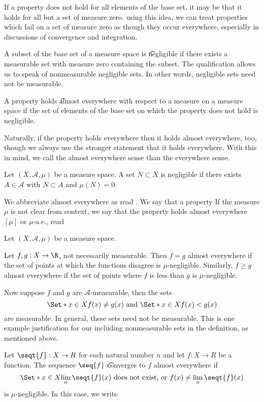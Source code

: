 

If a property does not hold for all elements of the base set, it may be that it holds for all but a set of measure zero.
using this idea, we can treat properties which fail on a set of measure zero as though they occur everywhere, especially in discussions of convergence and integration.


A subset of the base set of a measure space is \t{negligible} if there exists a measurable set with measure zero containing the subset.
The qualification  allows us to speak of nonmeasurable negligible sets.
In other words, negligible sets need not be measurable.


A property holds \t{almost everywhere} with respect to a measure on a measure space if the set of elements of the base set on which the property does not hold is negligible.

Naturally, if the property holds everywhere then it holds almost everywhere, too, though we always use the stronger statement that it holds everywhere.
With this in mind, we call the almost everywhere sense  than the everywhere sense.


Let $(X, \mathcal{A}, \mu)$ be a measure space.
A set $N \subset X$ is negligible if there exists $A \in \mathcal{A}$ with $N \subset A$ and $\mu(N) = 0$.

We abbreviate almost everywhere as  read .
We say that a property 
If the measure $\mu$ is not clear from context, we say that the property holds almost everywhere $[\mu]$ or $\mu$-a.e., read 


Let $(X, \mathcal{A}, \mu)$ be a measure space.


Let $f, g: X \to \R$, not necessarily measurable.
Then $f = g$ almost everywhere if the set of points at which the functions disagree is
$\mu$-negligible.
Similarly, $f \geq g$ almost everywhere if the set of points where $f$ is less than $g$ is $\mu$-negligible.

Now suppose $f$ and $g$ are $\mathcal{A}$-measurable, then the sets
\[
\Set*{x \in X}{f(x) \neq g(x)}
\text{ and }
\Set*{x \in X}{f(x) < g(x)}
\]
are measurable.
In general, these sets need not be measurable.
This is one example justification for our including nonmeasurable sets in the definition, as mentioned above.

Let $\seqt{f}: X \to R$ for each natural number $n$ and let $f: X \to R$ be a function.
The sequence $\seq{f}$ \t{converges to $f$ almost everywhere} if
\[
  \Set*{x \in X}{\lim_{n} \seqt{f}(x) \text{ does not exist, or } f(x) \neq \lim_{n} \seqt{f}(x)}
\]
is $\mu$-negligible.
In this case, we write
